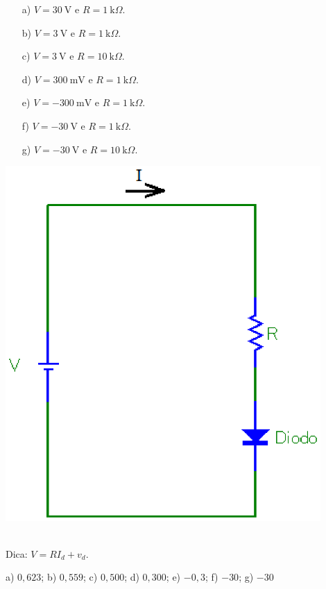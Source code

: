 \begin{minipage}[l]{0.6\linewidth}
\begin{itemize}
\item[a)] $V=30~\mbox{V}$ e $R=1~\mbox{k}\Omega$.
\item[b)] $V=3~\mbox{V}$ e $R=1~\mbox{k}\Omega$.
\item[c)] $V=3~\mbox{V}$ e $R=10~\mbox{k}\Omega$.
\item[d)] $V=300~\mbox{mV}$ e $R=1~\mbox{k}\Omega$.
\item[e)] $V=-300~\mbox{mV}$ e $R=1~\mbox{k}\Omega$.
\item[f)] $V=-30~\mbox{V}$ e $R=1~\mbox{k}\Omega$.
\item[g)] $V=-30~\mbox{V}$ e $R=10~\mbox{k}\Omega$.
\end{itemize}\end{minipage}\begin{minipage}[c]{0.4\linewidth}
\includegraphics[width=0.9\textwidth]{./cap_equacao1d/pics/circuito_diodo.eps}
\end{minipage}\\
Dica: $V=RI_d+v_d$.
\begin{Answer}
  \begin{tiny}
    a) $0,623$; b) $0,559$; c) $0,500$; d) $0,300$; e) $-0,3$; f) $-30$; g) $-30$
  \end{tiny}
\end{Answer}



